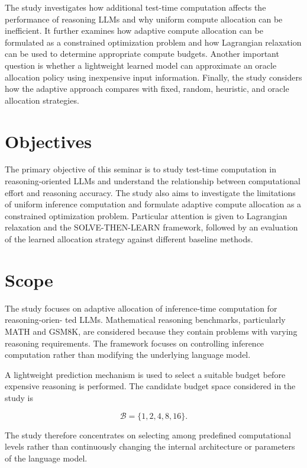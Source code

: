 \documentclass[12pt,a4paper,titlepage]{report}
\begin{document}
The study investigates how additional test-time computation affects the performance of reasoning LLMs and why uniform compute allocation can be inefficient. It further examines how adaptive compute allocation can be formulated as a constrained optimization problem and how Lagrangian relaxation can be used to determine appropriate compute budgets. Another important question is whether a lightweight learned model can approximate an oracle allocation policy using inexpensive input information. Finally, the study considers how the adaptive approach compares with fixed, random, heuristic, and oracle allocation strategies.

\section{Objectives}

The primary objective of this seminar is to study test-time computation in reasoning-oriented LLMs and understand the relationship between computational effort and reasoning accuracy. The study also aims to investigate the limitations of uniform inference computation and formulate adaptive compute allocation as a constrained optimization problem. Particular attention is given to Lagrangian relaxation and the SOLVE-THEN-LEARN framework, followed by an evaluation of the learned allocation strategy against different baseline methods.

\section{Scope}

The study focuses on adaptive allocation of inference-time computation for reasoning-orien- ted LLMs. Mathematical reasoning benchmarks, particularly MATH and GSM8K, are considered because they contain problems with varying reasoning requirements. The framework focuses on controlling inference computation rather than modifying the underlying language model.

A lightweight prediction mechanism is used to select a suitable budget before expensive reasoning is performed. The candidate budget space considered in the study is

\begin{equation}
\mathcal{B}=\{1,2,4,8,16\}.
\end{equation}

The study therefore concentrates on selecting among predefined computational levels rather than continuously changing the internal architecture or parameters of the language model.
\end{document}
